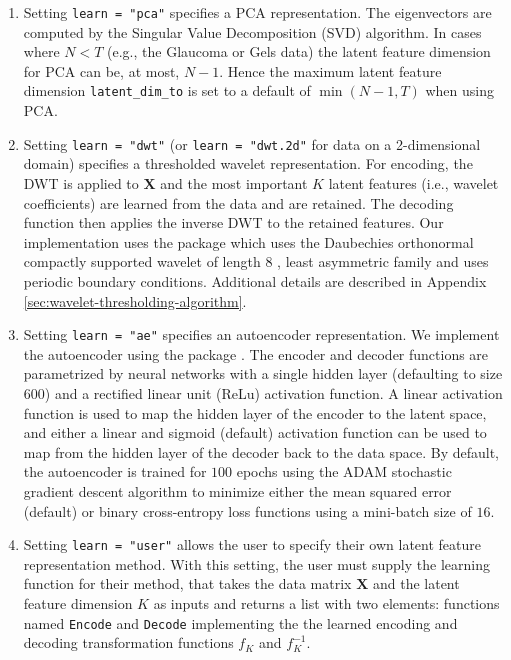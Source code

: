 \begin{enumerate}
    \item Setting \texttt{learn = "pca"} specifies a PCA representation. The eigenvectors are computed by the Singular Value Decomposition (SVD) algorithm. In cases where $N < T$ (e.g., the Glaucoma or Gels data) the latent feature dimension for PCA can be, at most, $N-1$. Hence the maximum latent feature dimension \texttt{latent\_dim\_to} is set to a default of $\min(N-1, T)$ when using PCA.
    \item Setting \texttt{learn = "dwt"} (or \texttt{learn = "dwt.2d"} for data on a 2-dimensional domain) specifies a thresholded wavelet representation. For encoding, the DWT is applied to $\mathbf{X}$ and the most important $K$ latent features (i.e., wavelet coefficients) are learned from the data and are retained. The decoding function then applies the inverse DWT to the retained features. Our implementation uses the   package \parencite{whitcher_waveslim_2024} which uses the Daubechies orthonormal compactly supported wavelet of length $8$ \parencite{daubechies_ten_1992}, least asymmetric family and uses periodic boundary conditions. Additional details are described in Appendix \ref{sec:wavelet-thresholding-algorithm}.
    \item Setting \texttt{learn = "ae"} specifies an autoencoder representation. We implement the autoencoder using the   package \parencite{kalinowski_keras_2024}. The encoder and decoder functions are parametrized by neural networks with a single hidden layer (defaulting to size $600$) and a rectified linear unit (ReLu) activation function.
    A linear activation function is used to map the hidden layer of the encoder to the latent space, and either a linear and sigmoid (default) activation function can be used to map from the hidden layer of the decoder back to the data space.
    By default, the autoencoder is trained for $100$ epochs using the ADAM stochastic gradient descent algorithm \parencite{kingma_adam_2017} to minimize either the mean squared error (default) or binary cross-entropy loss functions using a mini-batch size of $16$.
    \item Setting \texttt{learn = "user"} allows the user to specify their own latent feature representation method. With this setting, the user must supply the learning function for their method, that takes the data matrix $\mathbf{X}$ and the latent feature dimension $K$ as inputs and returns a list with two elements: functions named \texttt{Encode} and \texttt{Decode} implementing the the learned encoding and decoding transformation functions $f_K$ and $f_K^{-1}$.
\end{enumerate}

